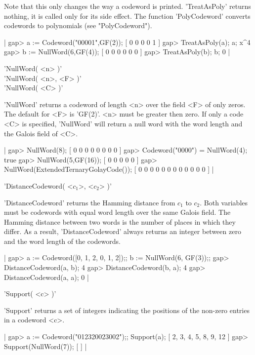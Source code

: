 Note that this only changes the way a codeword is printed.  'TreatAsPoly'
returns nothing,  it is called   only for its  side  effect. The function
'PolyCodeword' converts codewords to polynomials (see "PolyCodeword").

|    gap> a := Codeword("00001",GF(2));
    [ 0 0 0 0 1 ]
    gap> TreatAsPoly(a); a;
    x^4
    gap> b := NullWord(6,GF(4));
    [ 0 0 0 0 0 0 ]
    gap> TreatAsPoly(b); b;
    0 |


'NullWord( <n> )'\\
'NullWord( <n>, <F> )'\\
'NullWord( <C> )'

'NullWord' returns  a codeword of  length <n> over the  field <F> of only
zeros.  The default for <F> is 'GF(2)'. <n> must be greater then zero. If
only a code <C> is specified, 'NullWord' will return a null word with the
word length and the Galois field of <C>.

|    gap> NullWord(8);
    [ 0 0 0 0 0 0 0 0 ]
    gap> Codeword("0000") = NullWord(4);
    true
    gap> NullWord(5,GF(16));
    [ 0 0 0 0 0 ]
    gap> NullWord(ExtendedTernaryGolayCode());
    [ 0 0 0 0 0 0 0 0 0 0 0 0 ] |


'DistanceCodeword( <$c_1$>, <$c_2$> )'

'DistanceCodeword' returns the Hamming distance from $c_1$ to $c_2$. Both
variables  must be codewords with equal  word length over the same Galois
field. The Hamming distance between two words  is the number of places in
which  they  differ. As a  result,  'DistanceCodeword'  always returns an
integer between zero and the word length of the codewords.

|    gap> a := Codeword([0, 1, 2, 0, 1, 2]);; b := NullWord(6, GF(3));;
    gap> DistanceCodeword(a, b);
    4
    gap> DistanceCodeword(b, a);
    4
    gap> DistanceCodeword(a, a);
    0 |


'Support( <c> )'

'Support' returns  a set  of integers  indicating   the positions of  the
non-zero entries in a codeword <c>.

|    gap> a := Codeword("012320023002");; Support(a);
    [ 2, 3, 4, 5, 8, 9, 12 ]
    gap> Support(NullWord(7));
    [  ] |

